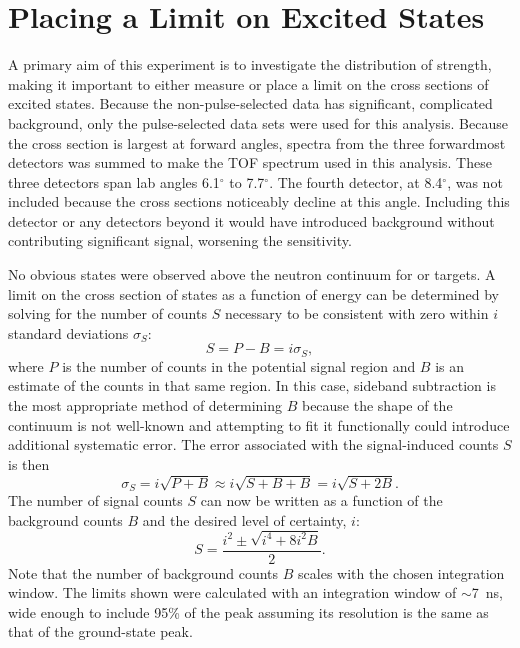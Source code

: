 \section{Placing a Limit on Excited \zp States}
\label{sec:zpLimit}

A primary aim of this experiment is to investigate the distribution of \zp strength, making it important to either measure or place a limit on the cross sections of excited \zp states.  Because the non-pulse-selected data has significant, complicated background, only the pulse-selected data sets were used for this analysis.  Because the \zp cross section is largest at forward angles, spectra from the three forwardmost detectors was summed to make the TOF spectrum used in this analysis.  These three detectors span lab angles 6.1$^{\circ}$ to 7.7$^{\circ}$.  The fourth detector, at 8.4$^{\circ}$, was not included because the \zp cross sections noticeably decline at this angle.  Including this detector or any detectors beyond it would have introduced background without contributing significant signal, worsening the sensitivity.    

No obvious \zp states were observed above the neutron continuum for  or  targets.  A limit on the cross section of \zp states as a function of energy can be determined by solving for the number of counts $S$ necessary to be consistent with zero within $i$ standard deviations $\sigma_S$:
\begin{equation}
S = P - B = i\sigma_S,
\end{equation}
where $P$ is the number of counts in the potential signal region and $B$ is an estimate of the counts in that same region.  In this case, sideband subtraction is the most appropriate method of determining $B$ because the shape of the continuum is not well-known and attempting to fit it functionally could introduce additional systematic error.  The error associated with the signal-induced counts $S$ is then
\begin{equation}
\sigma_S = i\sqrt{P+B} \approx i\sqrt{S+B+B} = i\sqrt{S+2B}.
\end{equation}
The number of signal counts $S$ can now be written as a function of the background counts $B$ and the desired level of certainty, $i$:
\begin{equation}
S = \frac{i^2 \pm \sqrt{i^4 + 8i^2B}}{2}.
\end{equation}
Note that the number of background counts $B$ scales with the chosen integration window.  The limits shown were calculated with an integration window of $\sim$7~ns, wide enough to include 95\% of the peak assuming its resolution is the same as that of the ground-state peak.

